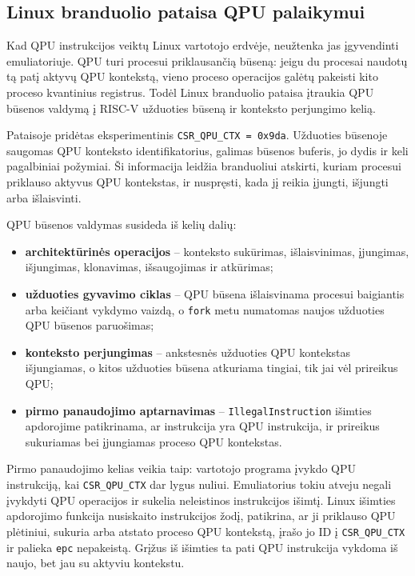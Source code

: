 \subsection{Linux branduolio pataisa QPU palaikymui}
\label{sec:linux-qpu-pataisa}

Kad QPU instrukcijos veiktų Linux vartotojo erdvėje, neužtenka jas įgyvendinti emuliatoriuje. QPU turi procesui priklausančią būseną: jeigu du procesai naudotų tą patį aktyvų QPU kontekstą, vieno proceso operacijos galėtų pakeisti kito proceso kvantinius registrus. Todėl Linux branduolio pataisa įtraukia QPU būsenos valdymą į RISC-V užduoties būseną ir konteksto perjungimo kelią.

Pataisoje pridėtas eksperimentinis \texttt{CSR\_QPU\_CTX = 0x9da}. Užduoties būsenoje saugomas QPU konteksto identifikatorius, galimas būsenos buferis, jo dydis ir keli pagalbiniai požymiai. Ši informacija leidžia branduoliui atskirti, kuriam procesui priklauso aktyvus QPU kontekstas, ir nuspręsti, kada jį reikia įjungti, išjungti arba išlaisvinti.

QPU būsenos valdymas susideda iš kelių dalių:

\begin{itemize}
    \item \textbf{architektūrinės operacijos} -- konteksto sukūrimas, išlaisvinimas, įjungimas, išjungimas, klonavimas, išsaugojimas ir atkūrimas;
    \item \textbf{užduoties gyvavimo ciklas} -- QPU būsena išlaisvinama procesui baigiantis arba keičiant vykdymo vaizdą, o \texttt{fork} metu numatomas naujos užduoties QPU būsenos paruošimas;
    \item \textbf{konteksto perjungimas} -- ankstesnės užduoties QPU kontekstas išjungiamas, o kitos užduoties būsena atkuriama tingiai, tik jai vėl prireikus QPU;
    \item \textbf{pirmo panaudojimo aptarnavimas} -- \texttt{IllegalInstruction} išimties apdorojime patikrinama, ar instrukcija yra QPU instrukcija, ir prireikus sukuriamas bei įjungiamas proceso QPU kontekstas.
\end{itemize}

Pirmo panaudojimo kelias veikia taip: vartotojo programa įvykdo QPU instrukciją, kai \texttt{CSR\_QPU\_CTX} dar lygus nuliui. Emuliatorius tokiu atveju negali įvykdyti QPU operacijos ir sukelia neleistinos instrukcijos išimtį. Linux išimties apdorojimo funkcija nusiskaito instrukcijos žodį, patikrina, ar ji priklauso QPU plėtiniui, sukuria arba atstato proceso QPU kontekstą, įrašo jo ID į \texttt{CSR\_QPU\_CTX} ir palieka \texttt{epc} nepakeistą. Grįžus iš išimties ta pati QPU instrukcija vykdoma iš naujo, bet jau su aktyviu kontekstu.
